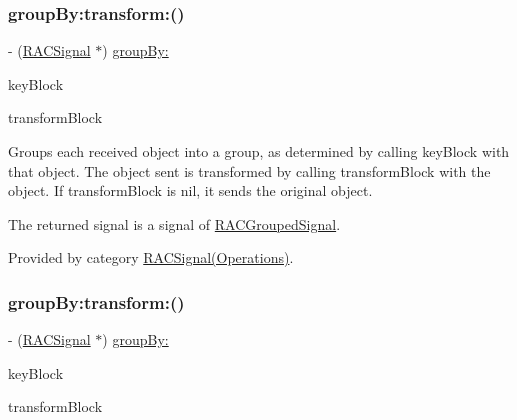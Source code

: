 \subsubsection{\texorpdfstring{group\+By\+:transform\+:()}{groupBy:transform:()}\hspace{0.1cm}{\footnotesize\ttfamily [2/3]}}
{\footnotesize\ttfamily -\/ (\mbox{\hyperlink{interface_r_a_c_signal}{R\+A\+C\+Signal}} $\ast$) \mbox{\hyperlink{category_r_a_c_signal_07_operations_08_a35f9a656ad047d90f6997aee136782e5}{group\+By\+:}} \begin{DoxyParamCaption}\item[{(id$<$ N\+S\+Copying $>$($^\wedge$)(id object))}]{key\+Block }\item[{transform:(id($^\wedge$)(id object))}]{transform\+Block }\end{DoxyParamCaption}}

Groups each received object into a group, as determined by calling {\ttfamily key\+Block} with that object. The object sent is transformed by calling {\ttfamily transform\+Block} with the object. If {\ttfamily transform\+Block} is nil, it sends the original object.

The returned signal is a signal of \mbox{\hyperlink{interface_r_a_c_grouped_signal}{R\+A\+C\+Grouped\+Signal}}. 

Provided by category \mbox{\hyperlink{category_r_a_c_signal_07_operations_08_ad04cf174e24905df96f211b60e31a3cd}{R\+A\+C\+Signal(\+Operations)}}.

\mbox{\label{interface_r_a_c_signal_ad04cf174e24905df96f211b60e31a3cd}} 
\subsubsection{\texorpdfstring{group\+By\+:transform\+:()}{groupBy:transform:()}\hspace{0.1cm}{\footnotesize\ttfamily [3/3]}}
{\footnotesize\ttfamily -\/ (\mbox{\hyperlink{interface_r_a_c_signal}{R\+A\+C\+Signal}} $\ast$) \mbox{\hyperlink{category_r_a_c_signal_07_operations_08_a35f9a656ad047d90f6997aee136782e5}{group\+By\+:}} \begin{DoxyParamCaption}\item[{(id$<$ N\+S\+Copying $>$($^\wedge$)(id object))}]{key\+Block }\item[{transform:(id($^\wedge$)(id object))}]{transform\+Block }\end{DoxyParamCaption}}

